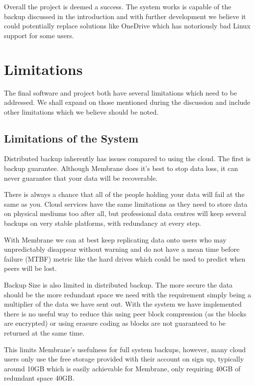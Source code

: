 \documentclass[11pt, a4paper, twoside]{report}
\begin{document}
Overall the project is deemed a success. The system works is capable of the backup discussed in the introduction and with further development we believe it could potentially replace solutions like OneDrive which has notoriously bad Linux support for some users.

\section{Limitations}

The final software and project both have several limitations which need to be addressed. We shall expand on those mentioned during the discussion and include other limitations which we believe should be noted.

\subsection{Limitations of the System}

Distributed backup inherently has issues compared to using the cloud. The first is backup guarantee. Although Membrane does it's best to stop data loss, it can never guarantee that your data will be recoverable.

There is always a chance that all of the people holding your data will fail at the same as you. Cloud services have the same limitations as they need to store data on physical mediums too after all, but professional data centres will keep several backups on very stable platforms, with redundancy at every step.

With Membrane we can at best keep replicating data onto users who may unpredictably disappear without warning and do not have a mean time before failure (MTBF) metric like the hard drives which could be used to predict when peers will be lost.

Backup Size is also limited in distributed backup. The more secure the data should be the more redundant space we need with the requirement simply being a multiplier of the data we have sent out. With the system we have implemented there is no useful way to reduce this using peer block compression (as the blocks are encrypted) or using erasure coding as blocks are not guaranteed to be returned at the same time.

This limits Membrane's usefulness for full system backups, however, many cloud users only use the free storage provided with their account on sign up, typically around 10GB which is easily achievable for Membrane, only requiring 40GB of redundant space 40GB.
\end{document}
